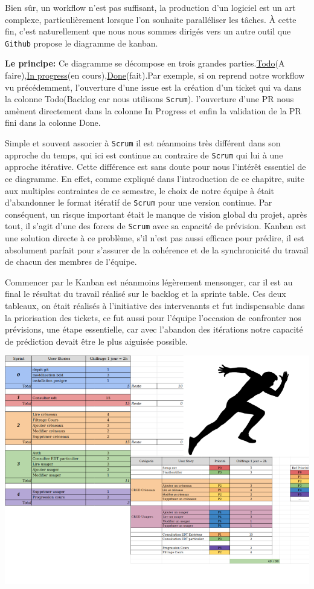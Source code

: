 \documentclass[a4paper,french,final]{memoir}
\begin{document}
Bien sûr, un workflow n'est pas suffisant, la production d'un logiciel est un art complexe, particulièrement lorsque
l'on souhaite paralléliser les tâches. À cette fin, c'est naturellement que nous nous sommes dirigés vers un autre outil que \texttt{Github} propose le diagramme de kanban.
\hspace{1cm}



\textbf{Le principe: }Ce diagramme se décompose en trois grandes parties.\underline{Todo}(A faire),\underline{In progress}(en cours),\underline{Done}(fait).Par exemple, si on reprend notre workflow vu précédemment, l'ouverture d'une issue est la création d'un ticket qui va dans la colonne Todo(Backlog car nous utilisons \texttt{Scrum}). l'ouverture d'une PR nous amènent directement dans
la colonne In Progress et enfin la validation de la PR fini dans la colonne Done.

Simple et souvent associer à \texttt{Scrum} il est néanmoins très différent dans son approche du temps, qui ici est continue au contraire
de \texttt{Scrum} qui lui à une approche itérative. Cette différence est sans doute pour nous l'intérêt essentiel de ce diagramme.
En effet, comme expliqué dans l'introduction de ce chapitre, suite aux multiples contraintes de ce semestre, le choix de notre équipe
à était d'abandonner le format itératif de \texttt{Scrum} pour une version continue. Par conséquent, un risque important
était le manque de vision global du projet, après tout, il s'agit d'une des forces de \texttt{Scrum} avec sa capacité de prévision. Kanban est une solution directe à ce problème, s'il n'est pas aussi efficace pour prédire, il est absolument parfait
pour s'assurer de la cohérence et de la synchronicité du travail de chacun des membres de l'équipe.

Commencer par le Kanban est néanmoins légèrement mensonger, car il est au final le résultat du travail réalisé sur le backlog et
la sprinte table. Ces deux tableaux, on était réalisés à l'initiative des intervenants et fut indispensable dans la priorisation des tickets, ce fut aussi pour l'équipe l'occasion de confronter nos prévisions, une étape essentielle, car avec l'abandon des itérations notre
capacité de prédiction devait être le plus aiguisée possible.

\includegraphics[width=0.9\linewidth]{figures/sprint.png}
\end{document}

